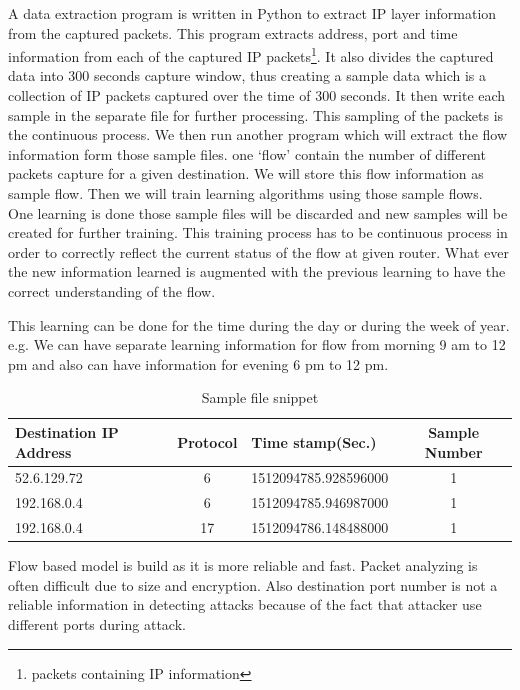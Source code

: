 \documentclass[10pt,oneside,a4paper]{article}
\begin{document}
 A data extraction program is written in Python to extract IP layer information from the captured packets. This program extracts address, port and time information from each of the captured IP packets\footnote{packets containing IP information}. It also divides the captured data into 300 seconds capture window, thus creating a sample data which is a collection of IP packets captured over the time of 300 seconds. It then write each sample in the separate file for further processing. This sampling of the packets is the continuous process. We then run another program which will extract the flow information form those sample files. one `flow' contain the number of different packets capture for a given destination. We will store this flow information as sample flow. Then we will train learning algorithms using those sample flows. One learning is done those sample files will be discarded and new samples will be created for further training. This training process has to be continuous process in order to correctly reflect the current status of the flow at given router. What ever the new information learned is augmented with the previous learning to have the correct understanding of the flow.

This learning can be done for the time during the day or during the week of year. e.g. We can have separate learning information for flow from morning 9 am to 12 pm and also can have information for evening 6 pm to 12 pm.

\begin{table}[H]
\centering
  \begin{tabular}{| l | c | l | c |}
    \hline
    Destination IP Address      & Protocol  & Time stamp(Sec.)  & Sample Number \\
    \hline
    52.6.129.72         & 6         & 1512094785.928596000  & 1 \\ \hline
    192.168.0.4         & 6         & 1512094785.946987000  & 1 \\ \hline
    192.168.0.4         & 17        & 1512094786.148488000  & 1 \\ \hline
  \end{tabular}
\caption{Sample file snippet} \label{table:sample-file-snippet}
\end{table}

Flow based model is build as it is more reliable and fast. Packet analyzing is often difficult due to size and encryption. Also destination port number is not a reliable information in detecting attacks because of the fact that attacker use different ports during attack.
\end{document}
